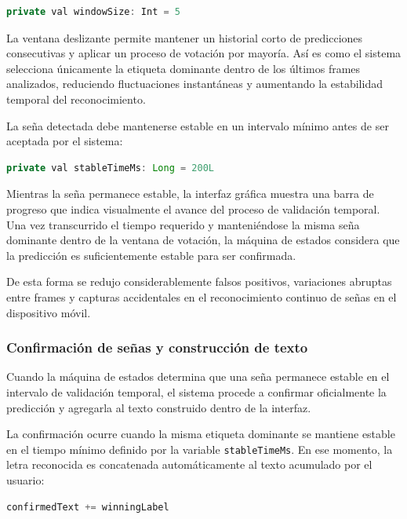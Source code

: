 	\begin{lstlisting}[language=java]
		private val windowSize: Int = 5
	\end{lstlisting}
	
	La ventana deslizante permite mantener un historial corto de predicciones consecutivas y aplicar un proceso de votación por mayoría. Así es como el sistema selecciona únicamente la etiqueta dominante dentro de los últimos frames analizados, reduciendo fluctuaciones instantáneas y aumentando la estabilidad temporal del reconocimiento.
	
	La seña detectada debe mantenerse estable en un intervalo mínimo antes de ser aceptada por el sistema:
	
	\begin{lstlisting}[language=java]
		private val stableTimeMs: Long = 200L
	\end{lstlisting}
	
	Mientras la seña permanece estable, la interfaz gráfica muestra una barra de progreso que indica visualmente el avance del proceso de validación temporal. Una vez transcurrido el tiempo requerido y manteniéndose la misma seña dominante dentro de la ventana de votación, la máquina de estados considera que la predicción es suficientemente estable para ser confirmada.
	
	De esta forma se redujo considerablemente falsos positivos, variaciones abruptas entre frames y capturas accidentales en el reconocimiento continuo de señas en el dispositivo móvil.
	
	\subsubsection{Confirmación de señas y construcción de texto}
	
	Cuando la máquina de estados determina que una seña permanece estable en el intervalo de validación temporal, el sistema procede a confirmar oficialmente la predicción y agregarla al texto construido dentro de la interfaz.
	
	La confirmación ocurre cuando la misma etiqueta dominante se mantiene estable en el tiempo mínimo definido por la variable \texttt{stableTimeMs}. En ese momento, la letra reconocida es concatenada automáticamente al texto acumulado por el usuario:
	
	\begin{lstlisting}[language=java]
		confirmedText += winningLabel
	\end{lstlisting}
	
